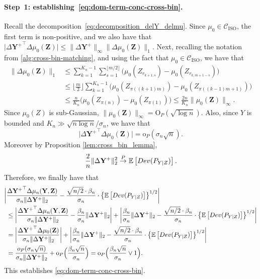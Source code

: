 \documentclass[12pt]{article}
\newcommand{\EE}[1]{\mathbb{E}\left[{#1}\right]}
\newcommand{\ISO}{\mathrm{ISO}}
\newcommand{\bY}{\mathbf{Y}}
\newcommand{\bZ}{\mathbf{Z}}
\begin{document}
    \paragraph{Step~1: establishing~\eqref{eq:dom-term-conc-cross-bin}.}
    Recall the decomposition~\eqref{eq:decomposition_delY_delmu}.  Since $\mu_0\in\mathcal{C}_\ISO$, the first term is non-positive, and we also have that $\bigl|{\Delta\bY^+}^\top\Delta\mu_0(\bZ)\bigr| \leq \|\Delta\bY^+\|_\infty\|\Delta\mu_0(\bZ)\|_1$. Next, recalling the notation from \cref{alg:cross-bin-matching}, and using the fact that $\mu_0\in\mathcal{C}_\ISO$, we have that 
   \begin{align}\label{eq:1-by-infty-crossbin}
       \|\Delta\mu_0(\bZ)\|_1&\leq \sum_{k=1}^{K_n-1}\sum_{s=1}^{\lfloor m/2\rfloor} \bigl(\mu_0(Z_{r_{k+1,s}})-\mu_0(Z_{r_{k,m+1-s}})\bigr)\nonumber\\
       &\leq \bigg\lfloor \frac{m}{2} \bigg\rfloor\sum_{k=1}^{K_n-1} \bigl(\mu_0(Z_{\pi((k+1)m)})-\mu_0(Z_{\pi((k-1)m+1)})\bigr)\nonumber\\
       &\leq \frac{n}{K_n} \bigl(\mu_0(Z_{\pi(n)})-\mu_0(Z_{\pi(1)})\bigr)
       \leq \frac{2n}{K_n} \|\mu_0(\bZ)\|_\infty.
   \end{align}
   Since $\mu_0(Z)$ is sub-Gaussian, $\|\mu_0(\bZ)\|_\infty=\mathrm{O}_P(\sqrt{\log n})$. Also, since $Y$ is bounded and $K_n\gg \sqrt{n\log n}/\sigma_n$, we have that 
   \[
   \bigl|{\Delta\bY^+}^\top\Delta\mu_0(\bZ)\bigr|=\mathrm{o}_P(\sigma_n\sqrt{n}).
   \]
    Moreover by Proposition \ref{lem:cross_bin_lemma},  
    \begin{equation}\label{eqn:concentration of cbin matching term}
        \frac{2}{n}\|\Delta\bY^+\|_2^2 \overset{P}{\to} \EE{\textnormal{Dev}(P_{Y\mid Z})}.
     \end{equation}
     Therefore, we finally have that
     \begin{align*}
         \biggl|&\frac{{\Delta\bY^+}^\top \Delta \mu_n(\bY,\bZ)}{\sigma_n\|\Delta\bY^+\|_2}-\frac{\sqrt{n/2}\cdot\beta_n}{\sigma_n}\cdot \bigl\{\EE{\textnormal{Dev}(P_{Y\mid Z})}\bigr\}^{1/2}\biggr|\\
         &\leq\biggl|\frac{{\Delta\bY^+}^\top \Delta \mu_n(\bY,\bZ)}{\sigma_n\|\Delta\bY^+\|_2}-\frac{\beta_n}{\sigma_n}\|\Delta\bY^+\|_2\biggr|+\biggl|\frac{\beta_n}{\sigma_n}\|\Delta\bY^+\|_2-\frac{\sqrt{n/2}\cdot\beta_n}{\sigma_n}\cdot \bigl\{\EE{\textnormal{Dev}(P_{Y\mid Z})}\bigr\}^{1/2}\biggr|\\
        &=\biggl|\frac{{\Delta\bY^+}^\top \Delta \mu_0(\bZ)}{\sigma_n\|\Delta\bY^+\|_2}\biggr|+\biggl|\frac{\beta_n}{\sigma_n}\|\Delta\bY^+\|_2-\frac{\sqrt{n/2}\cdot\beta_n}{\sigma_n}\cdot \bigl\{\EE{\textnormal{Dev}(P_{Y\mid Z})}\bigr\}^{1/2}\biggr|\\
         &= \frac{{\rm o}_P(\sigma_n\sqrt{n})}{\sigma_n\|\Delta\bY^+\|_2} + \mathrm{o}_P\Bigl(\frac{\beta_n\sqrt{n}}{\sigma_n}\Bigr)=\mathrm{o}_P\Bigl(\frac{\beta_n\sqrt{n}}{\sigma_n}\vee 1\Bigr).
     \end{align*}
     This establishes \eqref{eq:dom-term-conc-cross-bin}.
\end{document}
